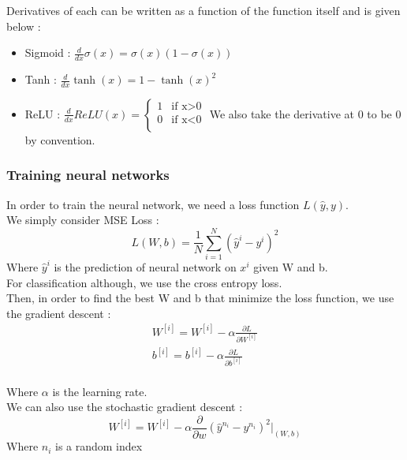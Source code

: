 \documentclass[../main.tex]{subfiles}
\begin{document}
Derivatives of each can be written as a function of the function itself and is given below : \begin{itemize}
    \item Sigmoid : $\frac{d}{dx}\sigma(x) = \sigma(x) (1-\sigma(x))$\\
    \item Tanh : $\frac{d}{dx} \tanh(x) = 1-\tanh(x)^2$\\
    \item ReLU : $\frac{d}{dx}ReLU(x) = \begin{cases}
        1 & \text{if x>0}\\
        0 & \text{if x<0}\\
    \end{cases}$ We also take the derivative at 0 to be 0 by convention.\\
\end{itemize}

\subsubsection{Training neural networks}
In order to train the neural network, we need a loss function $L(\hat{y},y)$.\\
We simply consider MSE Loss : \begin{equation}
    L(W,b) = \frac{1}{N} \sum_{i=1}^N(\hat{y}^i-y^i)^2
\end{equation}
Where $\hat{y}^i$ is the prediction of neural network on $x^i$ given W and b.\\

For classification although, we use the cross entropy loss.\\

Then, in order to find the best W and b that minimize the loss function, we use the gradient descent : \\
\begin{equation}
\begin{gathered}
    W^{[i]} = W^{[i]} - \alpha \frac{\partial L}{\partial W^{[i]}}\\
    b^{[i]} = b^{[i]} - \alpha \frac{\partial L}{\partial b^{[i]}}\\
    \end{gathered}
\end{equation}

Where $\alpha$ is the learning rate.\\

We can also use the stochastic gradient descent : \\
\begin{equation}
    W^{[i]} = W^{[i]} - \alpha \frac{\partial}{\partial w} (\hat{y}^{n_i}-y^{n_i})^2\lvert_{(W,b)}
\end{equation}
Where $n_i$ is a random index\\
\end{document}
